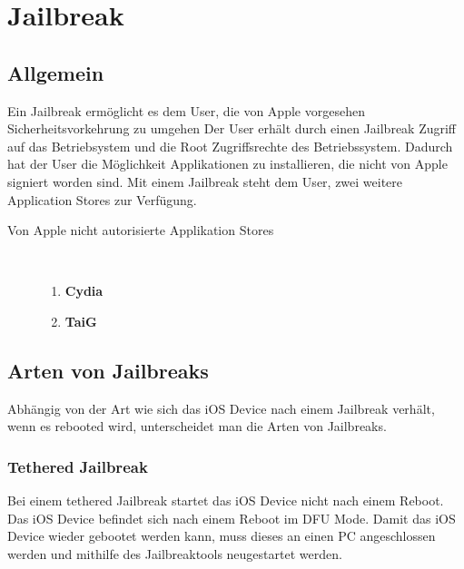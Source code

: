 %
%
% 
%
% 


\chapter{Jailbreak}
\label{ch:JB}

\section{Allgemein}
\label{sec:JBAllgemein}

Ein Jailbreak ermöglicht es dem User, die von Apple
vorgesehen Sicherheitsvorkehrung zu umgehen 
Der User erhält durch einen Jailbreak \glqq Zugriff\grqq{} auf das
Betriebsystem und die \glqq Root Zugriffsrechte \grqq{} des Betriebssystem.
Dadurch hat der User die Möglichkeit Applikationen zu installieren,
die nicht von Apple signiert worden sind. 
Mit einem Jailbreak steht dem User, zwei weitere \glqq Application Stores
\grqq{} zur Verfügung.

\begin{description}
\item[Von Apple nicht autorisierte \glqq Applikation Stores\grqq]~\par
	\begin{enumerate}
	   	\item \textbf{Cydia}
		\item \textbf{TaiG}
	\end{enumerate}
\end{description}

\section{Arten von Jailbreaks}
\label{sec:JBArten}
Abhängig von der Art wie sich das iOS Device nach einem Jailbreak verhält, wenn
es rebooted wird, unterscheidet man die Arten von Jailbreaks. 

\subsection{Tethered Jailbreak}
\label{sec:JBTethered}
Bei einem \glqq tethered Jailbreak\grqq{} startet das iOS Device nicht nach
einem Reboot. Das iOS Device befindet sich nach einem Reboot im DFU Mode.
Damit das iOS Device wieder gebootet werden kann, muss dieses an einen PC
angeschlossen werden und mithilfe des Jailbreaktools neugestartet werden.

